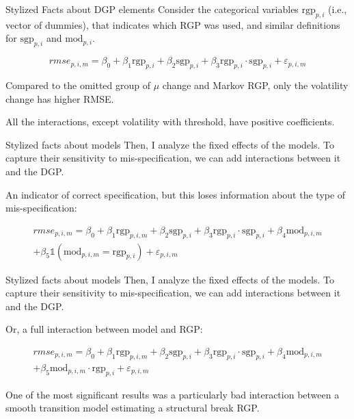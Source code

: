 \documentclass[
  ignorenonframetext,
]{beamer}
\newcommand{\sgp}{\text{sgp}}
\newcommand{\rgp}{\text{rgp}}
\renewcommand{\mod}{\text{mod}}
\begin{document}
\begin{frame}{Stylized Facts about DGP elements}
\label{stylized-facts-about-dgp-elements}
Consider the categorical variables \(\rgp_{p, i}\) (i.e., vector of
dummies), that indicates which RGP was used, and similar definitions for
\(\sgp_{p, i}\) and \(\mod_{p, i}\).

\begin{equation}
    rmse_{p, i, m} = \beta_0 + \beta_1 \rgp_{p, i} + \beta_2 \sgp_{p, i} + \beta_3 \rgp_{p, i} \cdot \sgp_{p, i} + \varepsilon_{p, i, m}
\end{equation}

Compared to the omitted group of \(\mu\) change and Markov RGP, only the
volatility change has higher RMSE.

All the interactions, except volatility with threshold, have positive
coefficients.
\end{frame}

\begin{frame}{Stylized facts about models}
\label{stylized-facts-about-models}
Then, I analyze the fixed effects of the models. To capture their
sensitivity to mis-specification, we can add interactions between it and
the DGP.

An indicator of correct specification, but this loses information about
the type of mis-specification:

\begin{multline}
    rmse_{p, i, m} = \beta_0 + \beta_1 \rgp_{p, i, m} + \beta_2 \sgp_{p, i} + \beta_3 \rgp_{p, i} \cdot \sgp_{p, i} + \beta_4 \mod_{p, i, m}\\ + \beta_5 \mathbb{1}(\mod_{p, i, m} = \rgp_{p, i}) + \varepsilon_{p, i, m}
\end{multline}
\end{frame}

\begin{frame}{Stylized facts about models}
\label{stylized-facts-about-models-1}
Then, I analyze the fixed effects of the models. To capture their
sensitivity to mis-specification, we can add interactions between it and
the DGP.

Or, a full interaction between model and RGP:

\begin{multline}
    rmse_{p, i, m} = \beta_0 + \beta_1 \rgp_{p, i, m} + \beta_2 \sgp_{p, i} + \beta_3 \rgp_{p, i} \cdot \sgp_{p, i} + \beta_4 \mod_{p, i, m}\\ + \beta_5 \mod_{p, i, m} \cdot \rgp_{p, i} + \varepsilon_{p, i, m}
\end{multline}

One of the most significant results was a particularly bad interaction
between a smooth transition model estimating a structural break RGP.
\end{frame}
\end{document}

